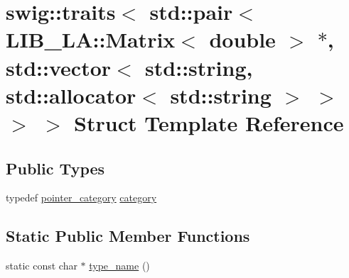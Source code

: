 \hypertarget{structswig_1_1traits_3_01std_1_1pair_3_01_l_i_b___l_a_1_1_matrix_3_01double_01_4_01_5_00_01std_16e7d6ce2d402ca14bbd204dfcec3c665}{}\section{swig\+:\+:traits$<$ std\+:\+:pair$<$ L\+I\+B\+\_\+\+LA\+:\+:Matrix$<$ double $>$ $\ast$, std\+:\+:vector$<$ std\+:\+:string, std\+:\+:allocator$<$ std\+:\+:string $>$ $>$ $>$ $>$ Struct Template Reference}
\label{structswig_1_1traits_3_01std_1_1pair_3_01_l_i_b___l_a_1_1_matrix_3_01double_01_4_01_5_00_01std_16e7d6ce2d402ca14bbd204dfcec3c665}
\subsection*{Public Types}
\begin{DoxyCompactItemize}
\item 
typedef \hyperlink{structswig_1_1pointer__category}{pointer\+\_\+category} \hyperlink{structswig_1_1traits_3_01std_1_1pair_3_01_l_i_b___l_a_1_1_matrix_3_01double_01_4_01_5_00_01std_16e7d6ce2d402ca14bbd204dfcec3c665_aac22f6a21ae5021331c7bc482d5a7835}{category}
\end{DoxyCompactItemize}
\subsection*{Static Public Member Functions}
\begin{DoxyCompactItemize}
\item 
static const char $\ast$ \hyperlink{structswig_1_1traits_3_01std_1_1pair_3_01_l_i_b___l_a_1_1_matrix_3_01double_01_4_01_5_00_01std_16e7d6ce2d402ca14bbd204dfcec3c665_a5c628984b7aa4b0e8699012bd2da7ec9}{type\+\_\+name} ()
\end{DoxyCompactItemize}


